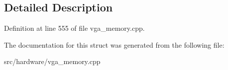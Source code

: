 \subsection{Detailed Description}


Definition at line 555 of file vga\-\_\-memory.\-cpp.



The documentation for this struct was generated from the following file\-:\begin{DoxyCompactItemize}
\item 
src/hardware/vga\-\_\-memory.\-cpp\end{DoxyCompactItemize}
